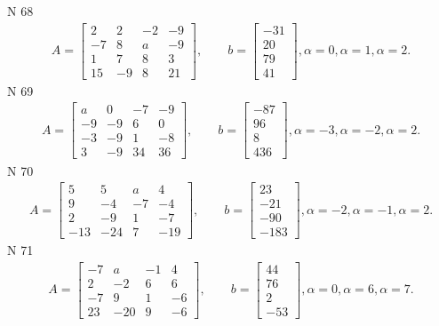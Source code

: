\documentclass[11pt]{report}
\begin{document}
N 68
\begin{align*}
 A = \left[\begin{matrix}2 & 2 & -2 & -9\\-7 & 8 & a & -9\\1 & 7 & 8 & 3\\15 & -9 & 8 & 21\end{matrix}\right],
    \qquad b = \left[\begin{matrix}-31\\20\\79\\41\end{matrix}\right], \alpha = 0, \alpha = 1, \alpha = 2. 
 \end{align*}
N 69
\begin{align*}
 A = \left[\begin{matrix}a & 0 & -7 & -9\\-9 & -9 & 6 & 0\\-3 & -9 & 1 & -8\\3 & -9 & 34 & 36\end{matrix}\right],
    \qquad b = \left[\begin{matrix}-87\\96\\8\\436\end{matrix}\right], \alpha = -3, \alpha = -2, \alpha = 2. 
 \end{align*}
N 70
\begin{align*}
 A = \left[\begin{matrix}5 & 5 & a & 4\\9 & -4 & -7 & -4\\2 & -9 & 1 & -7\\-13 & -24 & 7 & -19\end{matrix}\right],
    \qquad b = \left[\begin{matrix}23\\-21\\-90\\-183\end{matrix}\right], \alpha = -2, \alpha = -1, \alpha = 2. 
 \end{align*}
N 71
\begin{align*}
 A = \left[\begin{matrix}-7 & a & -1 & 4\\2 & -2 & 6 & 6\\-7 & 9 & 1 & -6\\23 & -20 & 9 & -6\end{matrix}\right],
    \qquad b = \left[\begin{matrix}44\\76\\2\\-53\end{matrix}\right], \alpha = 0, \alpha = 6, \alpha = 7. 
 \end{align*}
\end{document}
